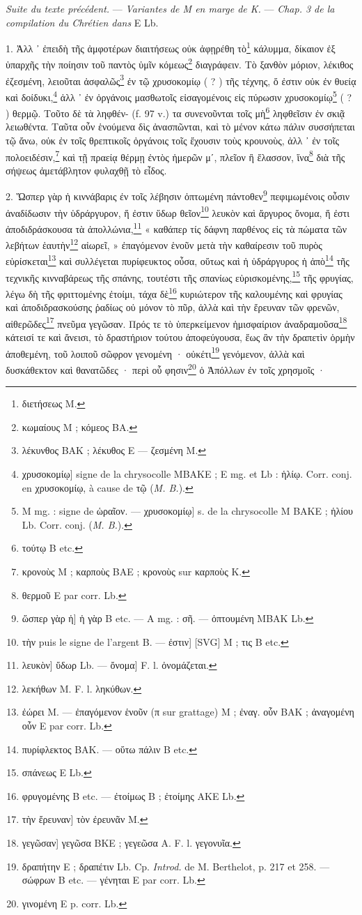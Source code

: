 \documentclass[a4paper, 11pt, oneside, polutonikogreek, french]{article}
\begin{document}
\emph{Suite du texte précédent.} --- \emph{Variantes de M en marge de K.} --- \emph{Chap. 3 de la compilation du Chrétien dans} E Lb.

1. Ἀλλ ᾽ ἐπειδὴ τῆς ἀμφοτέρων διαιτήσεως οὐκ ἀφῃρέθη τὸ\footnote{διετήσεως M.} κάλυμμα, δίκαιον ἐξ ὑπαρχῆς τὴν ποίησιν τοῦ παντὸς ὑμῖν κόμεως\footnote{κωμαίους M ; κόμεος BA.} διαγράφειν. Τὸ ξανθὸν μόριον, λέκιθος ἐζεσμένη, λειοῦται ἀσφαλῶς\footnote{λέκυνθος BAK ; λέκυθος E --- ζεσμένη M.} ἐν τῷ χρυσοκομίῳ ( ? ) τῆς τέχνης, ὅ ἐστιν οὐκ ἐν θυείᾳ καὶ δοίδυκι,\footnote{χρυσοκομίῳ] signe de la chrysocolle MBAKE ; E mg. et Lb : ἡλίῳ. Corr. conj. en χρυσοκομίῳ, à cause de τῷ (\emph{M. B.}).} ἀλλ ᾽ ἐν ὀργάνοις μασθωτοῖς εἰσαγομένοις εἰς πύρωσιν χρυσοκομίῳ\footnote{M mg. : signe de ὡραῖον. --- χρυσοκομίῳ] s. de la chrysocolle M BAKE ; ἡλίου Lb. Corr. conj. (\emph{M. B.}).} ( ? ) θερμῷ. Τοῦτο δὲ τὰ ληφθέν- (f. 97 v.) τα συνενοῦνται τοῖς μὴ\footnote{τούτῳ B etc.} ληφθεῖσιν ἐν σκιᾷ λειωθέντα. Ταῦτα οὖν ἑνούμενα δὶς ἀνασπῶνται, καὶ τὸ μένον κάτω πάλιν συσσήπεται τῷ ἄνω, οὐκ ἐν τοῖς θρεπτικοῖς ὀργάνοις τοῖς ἔχουσιν τοὺς κρουνοὺς, ἀλλ ᾽ ἐν τοῖς πολοειδέσιν,\footnote{κρονοὺς M ; καρποὺς BAE ; κρονοὺς sur καρποὺς K.} καὶ τῇ πραείᾳ θέρμῃ ἐντὸς ἡμερῶν μʹ, πλεῖον ἢ ἔλασσον, ἵνα\footnote{θερμοῦ E par corr. Lb.} διὰ τῆς σήψεως ἀμετάβλητον φυλαχθῇ τὸ εἶδος.

2. Ὥσπερ γὰρ ἡ κιννάβαρις ἐν τοῖς λέβησιν ὀπτωμένη πάντοθεν\footnote{ὥσπερ γὰρ ἡ] ἡ γὰρ B etc. --- A mg. : σῆ. --- ὀπτουμένη MBAK Lb.} πεφιμωμένοις οὖσιν ἀναδίδωσιν τὴν ὑδράργυρον, ἥ ἐστιν ὕδωρ θεῖον\footnote{τὴν puis le signe de l'argent B. --- ἐστιν] [SVG] M ; τις B etc.} λευκὸν καὶ ἄργυρος ὄνομα, ἥ ἐστι ἀποδιδράσκουσα τὰ ἀπολλώνια,\footnote{λευκὸν] ὕδωρ Lb. --- ὄνομα] F. l. ὀνομάζεται.} « καθάπερ τίς δάφνη παρθένος εἰς τὰ πώματα τῶν λεβήτων ἑαυτὴν\footnote{λεκήθων M. F. l. ληκύθων.} αἰωρεῖ, » ἐπαγόμενον ἑνοῦν μετὰ τὴν καθαίρεσιν τοῦ πυρὸς εὑρίσκεται\footnote{ἐώρει M. --- ἐπαγόμενον ἑνοῦν (π sur grattage) M ; ἐναγ. οὗν BAK ; ἀναγομένη οὖν E par corr. Lb.} καὶ συλλέγεται πυρίφευκτος οὖσα, οὕτως καὶ ἡ ὑδράργυρος ἡ ἀπὸ\footnote{πυρίφλεκτος BAK. --- οὕτω πάλιν B etc.} τῆς τεχνικῆς κινναβάρεως τῆς σπάνης, τουτέστι τῆς σπανίως εὑρισκομένης,\footnote{σπάνεως E Lb.} τῆς φρυγίας, λέγω δὴ τῆς φριττομένης ἐτοίμι, τάχα δὲ\footnote{φρυγομένης B etc. --- ἐτοίμως B ; ἐτοίμης AKE Lb.} κυριώτερον τῆς καλουμένης καὶ φρυγίας καὶ ἀποδιδρασκούσης ῥαδίως οὐ μόνον τὸ πῦρ, ἀλλὰ καὶ τὴν ἔρευναν τῶν φρενῶν, αἰθερῶδες\footnote{τὴν ἔρευναν] τὸν ἐρευνᾶν M.} πνεῦμα γεγῶσαν. Πρός τε τὸ ὑπερκείμενον ἡμισφαίριον ἀναδραμοῦσα\footnote{γεγῶσαν] γεγῶσα BKE ; γεγεῶσα A. F. l. γεγονυῖα.} κάτεισί τε καὶ ἄνεισι, τὸ δραστήριον τούτου ἀποφεύγουσα, ἕως ἂν τὴν δραπετὶν ὁρμὴν ἀποθεμένη, τοῦ λοιποῦ σῶφρον γενομένη · οὐκέτι\footnote{δραπήτην E ; δραπέτιν Lb. Cp. \emph{Introd.} de M. Berthelot, p. 217 et 258. --- σώφρων B etc. --- γένηται E par corr. Lb.} γενόμενον, ἀλλὰ καὶ δυσκάθεκτον καὶ θανατῶδες · περὶ οὗ φησιν\footnote{γινομένη E p. corr. Lb.} ὁ Ἀπόλλων ἐν τοῖς χρησμοῖς ·
\end{document}
